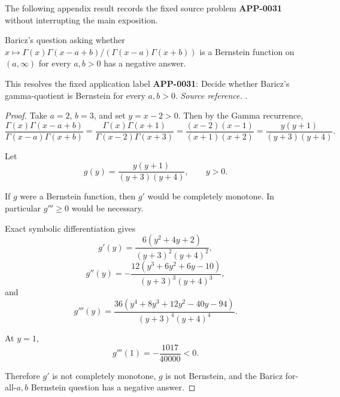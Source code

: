 The following appendix result records the fixed source problem \textbf{APP-0031} without interrupting the main exposition.
\begin{counterexample}
\label{res:baricz-gamma-quotient-bf-forall-negative-answer}
Baricz's question asking whether \(x\mapsto\Gamma(x)\Gamma(x-a+b)/(\Gamma(x-a)\Gamma(x+b))\) is a Bernstein function on \((a,\infty)\) for every \(a,b>0\) has a negative answer.

This resolves the fixed application label \textbf{APP-0031}: Decide whether Baricz's gamma-quotient is Bernstein for every \(a,b>0\).
\emph{Source reference.} \cite{app-app-0031-source}.
\end{counterexample}
\begin{proof}
Take \(a=2\), \(b=3\), and set \(y=x-2>0\). Then by the Gamma recurrence,
\[
\frac{\Gamma(x)\Gamma(x-a+b)}{\Gamma(x-a)\Gamma(x+b)}
=\frac{\Gamma(x)\Gamma(x+1)}{\Gamma(x-2)\Gamma(x+3)}
=\frac{(x-2)(x-1)}{(x+1)(x+2)}
=\frac{y(y+1)}{(y+3)(y+4)}.
\]

Let
\[
g(y)=\frac{y(y+1)}{(y+3)(y+4)},\qquad y>0.
\]

If \(g\) were a Bernstein function, then \(g'\) would be completely monotone. In particular \(g'''\ge0\) would be necessary.

Exact symbolic differentiation gives
\[
g'(y)=\frac{6(y^2+4y+2)}{(y+3)^2(y+4)^2},
\]
\[
g''(y)=
-\frac{12(y^3+6y^2+6y-10)}{(y+3)^3(y+4)^3},
\]
and
\[
g'''(y)=
\frac{36(y^4+8y^3+12y^2-40y-94)}{(y+3)^4(y+4)^4}.
\]

At \(y=1\),
\[
g'''(1)=-\frac{1017}{40000}<0.
\]

Therefore \(g'\) is not completely monotone, \(g\) is not Bernstein, and the Baricz for-all-\(a,b\) Bernstein question has a negative answer.
\end{proof}

